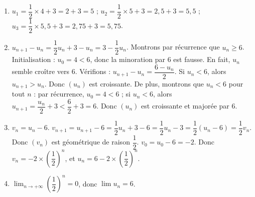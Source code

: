 \begin{enumerate}[label=\arabic*)]
\item $u_1 = \dfrac{1}{2}\times4 + 3 = 2+3=5$ ; $u_2 = \dfrac{1}{2}\times5 + 3 = 2,5+3=5,5$ ; $u_3 = \dfrac{1}{2}\times5,5 + 3 = 2,75+3=5,75$.
\item $u_{n+1} - u_n = \dfrac{1}{2}u_n + 3 - u_n = 3 - \dfrac{1}{2}u_n$. Montrons par récurrence que $u_n \geq 6$. Initialisation : $u_0=4 < 6$, donc la minoration par 6 est fausse. En fait, $u_n$ semble croître vers 6. Vérifions : $u_{n+1} - u_n = \dfrac{6 - u_n}{2}$. Si $u_n < 6$, alors $u_{n+1} > u_n$. Donc $(u_n)$ est croissante. De plus, montrons que $u_n < 6$ pour tout $n$ : par récurrence, $u_0=4<6$ ; si $u_n<6$, alors $u_{n+1} = \dfrac{u_n}{2}+3 < \dfrac{6}{2}+3 = 6$. Donc $(u_n)$ est croissante et majorée par 6.
\item $v_n = u_n - 6$. $v_{n+1} = u_{n+1} - 6 = \dfrac{1}{2}u_n + 3 - 6 = \dfrac{1}{2}u_n - 3 = \dfrac{1}{2}(u_n - 6) = \dfrac{1}{2}v_n$. Donc $(v_n)$ est géométrique de raison $\dfrac{1}{2}$. $v_0 = u_0 - 6 = -2$. Donc $v_n = -2 \times \left(\dfrac{1}{2}\right)^n$, et $u_n = 6 - 2 \times \left(\dfrac{1}{2}\right)^n$.
\item $\lim_{n\to+\infty} \left(\dfrac{1}{2}\right)^n = 0$, donc $\lim u_n = 6$.
\end{enumerate}